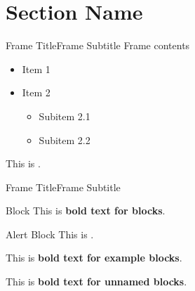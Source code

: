 \section{Section Name}
\graphicspath{{figs/section1/}} %

\begin{frame}{Frame Title}{Frame Subtitle}
    Frame contents
     \begin{itemize}
        \item Item 1
        \item Item 2
        \begin{itemize}
            \item Subitem 2.1 
            \item Subitem 2.2 
        \end{itemize}
    \end{itemize}
    This is .
\end{frame}

\begin{frame}{Frame Title}{Frame Subtitle}
    \begin{block}{Block}
        This is \textbf{bold text for blocks}.
    \end{block}
    \begin{alertblock}{Alert Block}
        This is .
    \end{alertblock}
    \begin{example}
        This is \textbf{bold text for example blocks}.
    \end{example}
    \begin{block}{}
        \centering
        This is \textbf{bold text for unnamed blocks}.
    \end{block}
\end{frame}

